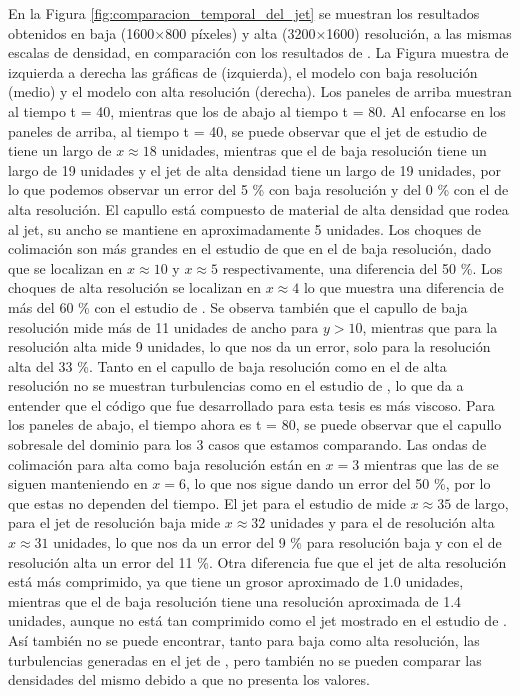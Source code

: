 \documentclass[12pt,a4paper]{book}
\begin{document}
En la Figura \ref{fig:comparacion_temporal_del_jet}  se muestran los resultados obtenidos en baja 
(1600$\times$800 píxeles) y alta (3200$\times$1600) resolución, a 
las mismas escalas de densidad, en comparación con los resultados de \citet{MB-HLLC-I}.
La Figura muestra de izquierda a derecha las gráficas de \citet{MB-HLLC-I} (izquierda), el modelo con baja resolución 
(medio) y el modelo con alta resolución (derecha). Los paneles de arriba muestran al tiempo t = 40, mientras que los 
de abajo al tiempo t = 80.
Al enfocarse en los paneles de arriba, al tiempo t = 40, se puede observar que el jet de estudio de \citet{MB-HLLC-I} tiene un largo 
de $x \approx 18$ unidades, mientras que el de baja resolución tiene un largo de 19 unidades y 
el jet de alta densidad  tiene un largo de 19 unidades, por lo que podemos observar un error del 5 \% 
con baja resolución y del 0 \% con el de alta resolución. El capullo está compuesto de material de alta densidad 
que rodea al jet, su ancho se mantiene en aproximadamente 5 unidades.
Los choques de colimación son más grandes en el estudio de \citet{MB-HLLC-I}
que en el de baja resolución, 
dado que se localizan en $x \approx 10$ y $x \approx 5$ respectivamente, una diferencia del 50 \%. 
Los choques de alta resolución se localizan en $x \approx 4$  lo que muestra una diferencia de más del 
60 \% con el estudio de \citet{MB-HLLC-I}.
Se observa también que el capullo de baja resolución mide más de 11 unidades de ancho para $y > 10$, 
mientras que para la resolución alta mide 9 unidades, lo que nos da un error, solo para la resolución alta del 33 \%.
Tanto en el capullo de baja resolución como en el de alta resolución no se muestran turbulencias 
como en el estudio de \citet{MB-HLLC-I}, lo que da a entender  que el código que fue desarrollado para esta tesis 
es más viscoso.
Para los paneles de abajo, el tiempo ahora es t = 80, se puede observar que el capullo sobresale del dominio para los 
3 casos que estamos comparando. Las ondas de colimación para alta como baja resolución están en $x = 3$ mientras que las de \citet{MB-HLLC-I} se siguen manteniendo en $x = 6$, lo que nos sigue dando un error 
del 50 \%, por lo que estas no dependen del tiempo. 
El jet para el estudio de \citet{MB-HLLC-I} mide $x \approx 35$ de largo, para el jet de resolución baja mide $x \approx 32$ unidades y 
para el de resolución alta $x \approx 31$ unidades, lo que nos da un error del 9 \% para resolución baja y con el 
de resolución alta un error del 11 \%.
Otra diferencia fue que el jet de 
alta resolución está más comprimido, ya que tiene un grosor aproximado de 1.0 unidades, 
mientras que el de baja resolución tiene una resolución aproximada de 1.4 unidades, 
aunque no está tan comprimido como el jet mostrado en el estudio de \citet{MB-HLLC-I}. Así también no se puede encontrar, tanto para baja como 
alta resolución, las turbulencias generadas en el jet de \citet{MB-HLLC-I}, pero también no se pueden comparar las densidades del 
mismo debido a que no presenta los valores.
\end{document}
